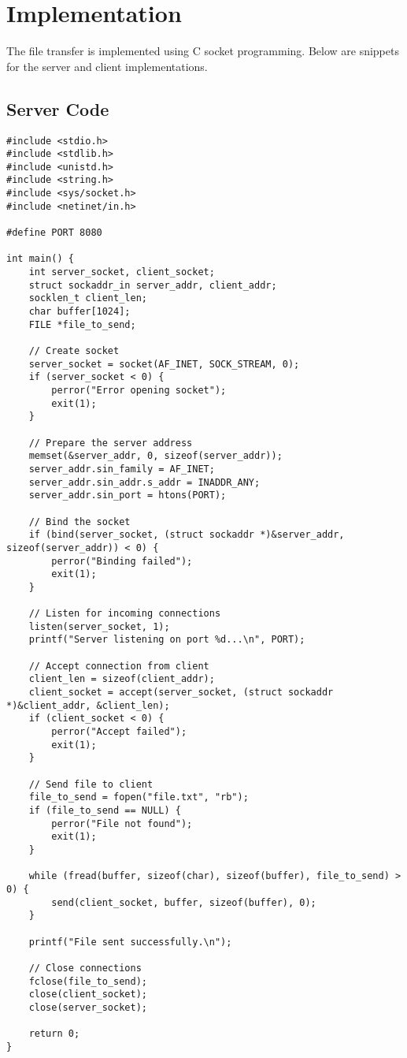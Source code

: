 \documentclass[a4paper,12pt]{article}
\begin{document}
\section*{Implementation}
The file transfer is implemented using C socket programming. Below are snippets for the server and client implementations.

\subsection*{Server Code}
\begin{verbatim}
#include <stdio.h>
#include <stdlib.h>
#include <unistd.h>
#include <string.h>
#include <sys/socket.h>
#include <netinet/in.h>

#define PORT 8080

int main() {
    int server_socket, client_socket;
    struct sockaddr_in server_addr, client_addr;
    socklen_t client_len;
    char buffer[1024];
    FILE *file_to_send;

    // Create socket
    server_socket = socket(AF_INET, SOCK_STREAM, 0);
    if (server_socket < 0) {
        perror("Error opening socket");
        exit(1);
    }

    // Prepare the server address
    memset(&server_addr, 0, sizeof(server_addr));
    server_addr.sin_family = AF_INET;
    server_addr.sin_addr.s_addr = INADDR_ANY;
    server_addr.sin_port = htons(PORT);

    // Bind the socket
    if (bind(server_socket, (struct sockaddr *)&server_addr, sizeof(server_addr)) < 0) {
        perror("Binding failed");
        exit(1);
    }

    // Listen for incoming connections
    listen(server_socket, 1);
    printf("Server listening on port %d...\n", PORT);

    // Accept connection from client
    client_len = sizeof(client_addr);
    client_socket = accept(server_socket, (struct sockaddr *)&client_addr, &client_len);
    if (client_socket < 0) {
        perror("Accept failed");
        exit(1);
    }

    // Send file to client
    file_to_send = fopen("file.txt", "rb");
    if (file_to_send == NULL) {
        perror("File not found");
        exit(1);
    }

    while (fread(buffer, sizeof(char), sizeof(buffer), file_to_send) > 0) {
        send(client_socket, buffer, sizeof(buffer), 0);
    }

    printf("File sent successfully.\n");

    // Close connections
    fclose(file_to_send);
    close(client_socket);
    close(server_socket);

    return 0;
}
\end{verbatim}
\end{document}
